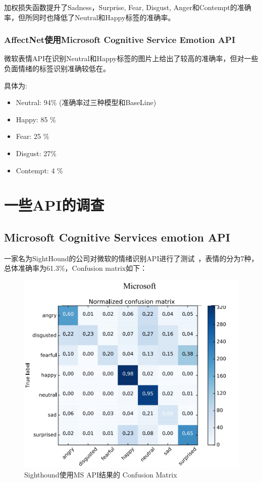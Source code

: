 \documentclass[11pt, a4paper]{article}
\begin{document}
\begin{CJK}{UTF8}{gbsn}
加权损失函数提升了Sadness，Surprise, Fear, Disgust, Anger和Contempt的准确率，但所同时也降低了Neutral和Happy标签的准确率。

\subsubsection{AffectNet使用Microsoft Cognitive Service Emotion API}

微软表情API在识别Neutral和Happy标签的图片上给出了较高的准确率，但对一些负面情绪的标签识别准确较低在。

具体为:
\begin{itemize}
\item Neutral: 94\% (准确率过三种模型和BaseLine)
\item Happy:  85 \% 
\item Fear:  25 \%
\item Disgust: 27\%
\item Contempt: 4 \%
\end{itemize}

\section{一些API的调查}

\subsection{Microsoft Cognitive Services emotion API}

一家名为SightHound的公司对微软的情绪识别API进行了测试~\cite{ref:sight}，表情的分为7种，总体准确率为61.3\%，Confusion matrix如下：

\begin{figure}[htbp]
	\centering %
	
	\includegraphics[width=12cm]{ms_cm}
	\caption{Sighthound使用MS API结果的 Confusion Matrix}
	\label{fig:ms_cm}
\end{figure}



\end{CJK}
\end{document}
